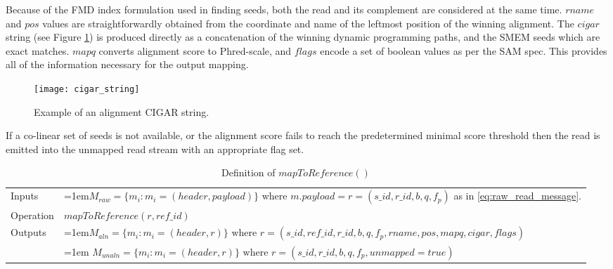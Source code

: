 Because of the FMD index formulation used in finding seeds, both the read and its complement are considered at the same time. $rname$ and $pos$ values are straightforwardly obtained from the coordinate and name of the leftmost position of the winning alignment. The $cigar$ string (see Figure \ref{fig:main_body_cigar_string}) is produced directly as a concatenation of the winning dynamic programming paths, and the SMEM seeds which are exact matches. $mapq$ converts alignment score to Phred-scale, and $flags$ encode a set of boolean values as per the SAM spec. This provides all of the information necessary for the output mapping.

\begin{figure}[H]
    \texttt{[image: cigar\_string]}
    \centering
    \caption {Example of an alignment CIGAR string.}
    \label{fig:main_body_cigar_string}
\end{figure}

If a co-linear set of seeds is not available, or the alignment score fails to reach the predetermined minimal score threshold then the read is emitted into the unmapped read stream with an appropriate flag set.

\bgroup
\def\arraystretch{1.5}
\begin{table}[!ht]
    \caption{Definition of $mapToReference()$}
    \label{tab:op_map_read_to_reference}
    {\begin{tabular}{l|p{12cm}}
    \toprule
    Inputs & \hangindent=1em$M_{raw} = \{m_i: m_i = (header, payload)\}$ where $m.payload = r = (s\_id, r\_id, b, q, f_p)$ as in \ref{eq:raw_read_message}. \\
    \cline{2-2}
    Operation & $mapToReference(r, ref\_id)$\\
    \cline{2-2}
    \multirow{2}{*}{Outputs} & \hangindent=1em$M_{aln} = \{m_i: m_i = (header, r)\} \text{ where } r = (s\_id, ref\_id, r\_id, b, q, f_p, rname, pos, mapq, cigar, flags)$\\
    & \hangindent=1em $M_{unaln} = \{m_i: m_i = (header, r)\} \text{  where } r = (s\_id, r\_id, b, q, f_p, unmapped=true)$\\
    \bottomrule
    \end{tabular}}
\end{table}
\egroup


